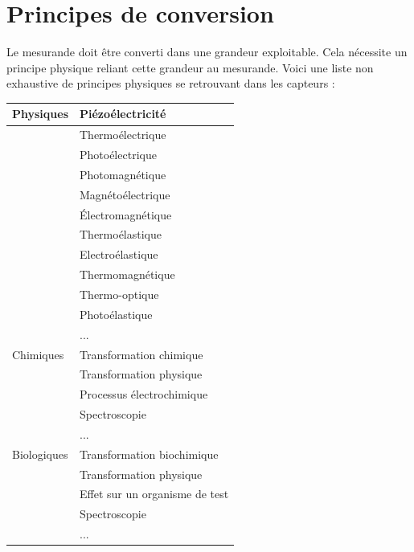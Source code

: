 \documentclass[main.tex]{subfiles}
\begin{document}
\section{Principes de conversion}

Le mesurande doit être converti dans une grandeur exploitable. Cela nécessite un principe physique reliant cette grandeur au mesurande. Voici une liste non exhaustive de principes physiques se retrouvant dans les capteurs :

\begin {center}
\begin{tabular}{|p{4.2cm}|p{9.5cm}|}
    \hline
    Physiques   & Piézoélectricité               \\
    \hline
                & Thermoélectrique               \\
    \hline
                & Photoélectrique                \\
    \hline
                & Photomagnétique                \\
    \hline
                & Magnétoélectrique              \\
    \hline
                & Électromagnétique              \\
    \hline
                & Thermoélastique                \\
    \hline
                & Electroélastique               \\
    \hline
                & Thermomagnétique               \\
    \hline
                & Thermo-optique                 \\
    \hline
                & Photoélastique                 \\
    \hline
                & ...                            \\
    \hline
    Chimiques   & Transformation chimique        \\
    \hline
                & Transformation physique        \\
    \hline
                & Processus électrochimique      \\
    \hline
                & Spectroscopie                  \\
    \hline
                & ...                            \\
    \hline
    Biologiques & Transformation biochimique     \\
    \hline
                & Transformation physique        \\
    \hline
                & Effet sur un organisme de test \\
    \hline
                & Spectroscopie                  \\
    \hline
                & ...                            \\
    \hline
\end{tabular}
\end{center}
\end{document}
